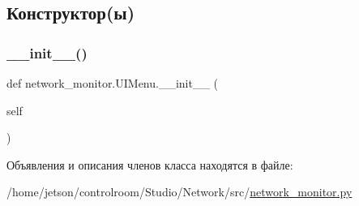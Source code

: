 \subsection{Конструктор(ы)}
\mbox{\label{classnetwork__monitor_1_1_u_i_menu_a2747f83c587a0d29338be7d190c7ab0c}} 
\subsubsection{\texorpdfstring{\+\_\+\+\_\+init\+\_\+\+\_\+()}{\_\_init\_\_()}}
{\footnotesize\ttfamily def network\+\_\+monitor.\+U\+I\+Menu.\+\_\+\+\_\+init\+\_\+\+\_\+ (\begin{DoxyParamCaption}\item[{}]{self }\end{DoxyParamCaption})}



Объявления и описания членов класса находятся в файле\+:\begin{DoxyCompactItemize}
\item 
/home/jetson/controlroom/\+Studio/\+Network/src/\hyperlink{network__monitor_8py}{network\+\_\+monitor.\+py}\end{DoxyCompactItemize}
